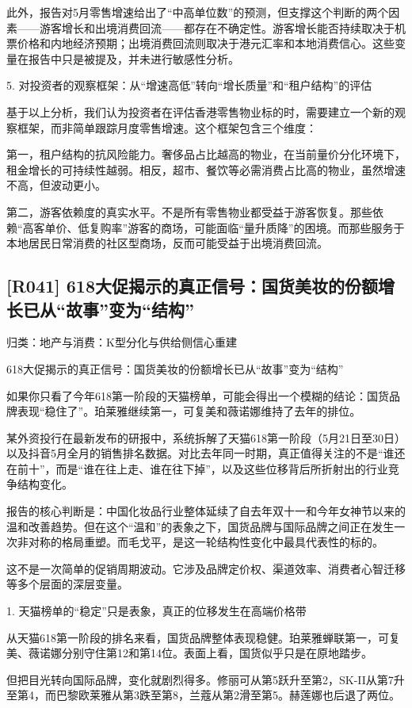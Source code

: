 \documentclass[11pt]{ctexart}
\begin{document}
此外，报告对5月零售增速给出了“中高单位数”的预测，但支撑这个判断的两个因素——游客增长和出境消费回流——都存在不确定性。游客增长能否持续取决于机票价格和内地经济预期；出境消费回流则取决于港元汇率和本地消费信心。这些变量在报告中只是被提及，并未进行敏感性分析。

5. 对投资者的观察框架：从“增速高低”转向“增长质量”和“租户结构”的评估

基于以上分析，我们认为投资者在评估香港零售物业标的时，需要建立一个新的观察框架，而非简单跟踪月度零售增速。这个框架包含三个维度：

第一，租户结构的抗风险能力。奢侈品占比越高的物业，在当前量价分化环境下，租金增长的可持续性越弱。相反，超市、餐饮等必需消费占比高的物业，虽然增速不高，但波动更小。

第二，游客依赖度的真实水平。不是所有零售物业都受益于游客恢复。那些依赖“高客单价、低复购率”游客的商场，可能面临“量升质降”的困境。而那些服务于本地居民日常消费的社区型商场，反而可能受益于出境消费回流。

\subsection{[R041] 618大促揭示的真正信号：国货美妆的份额增长已从“故事”变为“结构”}
{\small\color{refgray}归类：地产与消费：K型分化与供给侧信心重建}

618大促揭示的真正信号：国货美妆的份额增长已从“故事”变为“结构”

如果你只看了今年618第一阶段的天猫榜单，可能会得出一个模糊的结论：国货品牌表现“稳住了”。珀莱雅继续第一，可复美和薇诺娜维持了去年的排位。

某外资投行在最新发布的研报中，系统拆解了天猫618第一阶段（5月21日至30日）以及抖音5月全月的销售排名数据。对比去年同一时期，真正值得关注的不是“谁还在前十”，而是“谁在往上走、谁在往下掉”，以及这些位移背后所折射出的行业竞争结构变化。

报告的核心判断是：中国化妆品行业整体延续了自去年双十一和今年女神节以来的温和改善趋势。但在这个“温和”的表象之下，国货品牌与国际品牌之间正在发生一次非对称的格局重塑。而毛戈平，是这一轮结构性变化中最具代表性的标的。

这不是一次简单的促销周期波动。它涉及品牌定价权、渠道效率、消费者心智迁移等多个层面的深层变量。

1. 天猫榜单的“稳定”只是表象，真正的位移发生在高端价格带

从天猫618第一阶段的排名来看，国货品牌整体表现稳健。珀莱雅蝉联第一，可复美、薇诺娜分别守住第12和第14位。表面上看，国货似乎只是在原地踏步。

但把目光转向国际品牌，变化就剧烈得多。修丽可从第5跃升至第2，SK-II从第7升至第4，而巴黎欧莱雅从第3跌至第8，兰蔻从第2滑至第5。赫莲娜也后退了两位。
\end{document}

